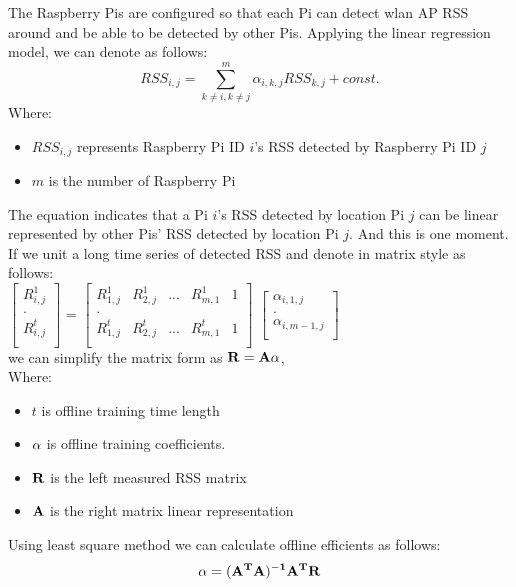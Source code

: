 \documentclass[10pt,conference]{IEEEtran}
\begin{document}
The Raspberry Pis are configured so that each Pi can detect wlan AP RSS around and be able to be detected by other Pis. Applying the linear regression model, we can denote as follows:
$$RSS_{i,j}=\sum_{k\neq i, k\neq j}^m\alpha_{i,k,j}RSS_{k,j}+const.$$
Where: 
\begin{itemize}
	\item $RSS_{i,j}$ represents Raspberry Pi ID $i$'s RSS detected by Raspberry Pi ID $j$
	\item $m$ is the number of Raspberry Pi
\end{itemize}

The equation indicates that a Pi $i$'s RSS detected by location Pi $j$ can be linear represented by other Pis' RSS detected by location Pi $j$. And this is one moment. If we unit a long time series of detected RSS and denote in matrix style as follows: \\

$\begin{bmatrix}
R_{i,j}^1 \\
. \\
R_{i,j}^t  \\
\end{bmatrix}$ = 
$\begin{bmatrix}
R_{1,j}^1 & R_{2,j}^1 & ... & R_{m,1}^1 & 1 \\
. \\
R_{1,j}^t & R_{2,j}^t & ... & R_{m,1}^t & 1 \\
\end{bmatrix}$  
$\begin{bmatrix}
\alpha_{i,1,j} \\
. \\
\alpha_{i,m-1,j} \\
\end{bmatrix}$  \\
we can simplify the matrix form as $\bold{R=A\alpha}$, \\
Where: 
\begin{itemize}
	\item $t$ is offline training time length
	\item $\bold{\alpha}$ is offline training coefficients.
	\item $\bold{R}$ is the left measured RSS matrix
	\item $\bold{A}$ is the right matrix linear representation
\end{itemize}

Using least square method we can calculate offline efficients as follows:
$$\bold{\alpha=(A^TA)^{-1}A^TR}$$
\end{document}
